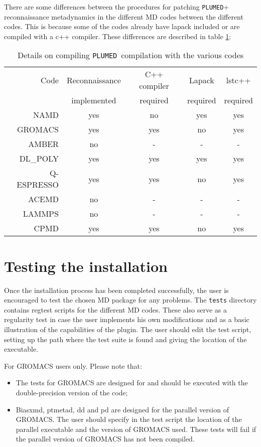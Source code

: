 \documentclass[12pt,fleqn]{report}
\newcommand{\plumed}{{\tt PLUMED}}
\begin{document}
There are some differences between the procedures for patching \plumed +  reconnaissance metadynamics in the different MD codes between the different codes.  This is because some of the codes already have lapack included or are compiled with a c++ compiler.  These differences are described in table \ref{tab:recon_table}:

\begin{table}
\centering
\begin{tabular}{ r c c c c } 
Code & Reconnaissance & C++ compiler & Lapack & lstc++    \\
& implemented &  required & required & required \\[0.1cm] \hline
NAMD  & yes & no & yes & yes \\
GROMACS & yes & yes & no & yes \\
AMBER   & no &  - & - & -       \\
DL\_POLY & yes & yes & yes & yes \\
Q-ESPRESSO & yes & yes & no & yes \\
ACEMD & no & - & - & - \\
LAMMPS & no & - & - & - \\ 
CPMD & yes & yes & no & yes \\ \hline
\end{tabular}
\caption{ Details on compiling \plumed\ compilation with the various codes}
\label{tab:recon_table}
\end{table} 

\section{Testing the installation}
\label{sec.regtest}

Once the installation process has been completed successfully, 
the user is encouraged to test  the chosen MD package for any problems.
The {\tt tests} directory contains regtest scripts for the different MD codes.
These also serve as a regularity test in case the user implements his own modifications and 
as a basic illustration of the capabilities  of the plugin.
The user should edit the test script,
setting up the path where the test suite is found and giving the location of the executable.

For GROMACS users only. Please note that:
\begin{itemize}
\item The tests for GROMACS are designed for and should be executed with the
double-precision version of the code;
\item Biasxmd, ptmetad, dd and pd are designed for the parallel version of GROMACS.
The user should specify in the test script the location of the parallel executable and the version
of GROMACS used. These tests will fail if the parallel version of
    GROMACS has not been compiled. 
\end{itemize}
\end{document}
